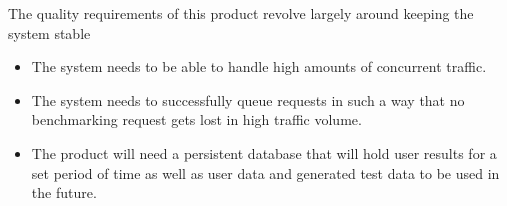 The quality requirements of this product revolve largely around keeping the 
system stable
\begin{itemize}
 \item The system needs to be able to handle high amounts of concurrent traffic.
 \item The system needs to successfully queue requests in such a way that no
	   benchmarking request gets lost in high traffic volume.
 \item The product will need a persistent database that will hold user results
       for a set period of time as well as user data and generated test data to
       be used in the future. 
\end{itemize}